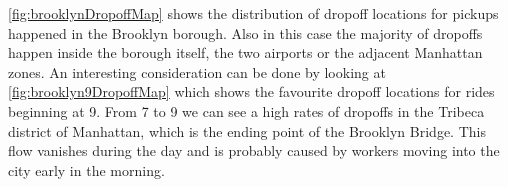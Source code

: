 \documentclass{acm_proc_article-sp-sigmod09}
\begin{document}
\cref{fig:brooklynDropoffMap} shows the distribution of dropoff locations for pickups happened in the Brooklyn borough. Also in this case the majority of dropoffs happen inside the borough itself, the two airports or the adjacent Manhattan zones. An interesting consideration can be done by looking at \cref{fig:brooklyn9DropoffMap} which shows the favourite dropoff locations for rides beginning at 9. From 7 to 9 we can see a high rates of dropoffs in the Tribeca district of Manhattan, which is the ending point of the Brooklyn Bridge. This flow vanishes during the day and is probably caused by workers moving into the city early in the morning. 

\begin{figure}
	\centering
	\\
	\\

\end{figure}
\end{document}
